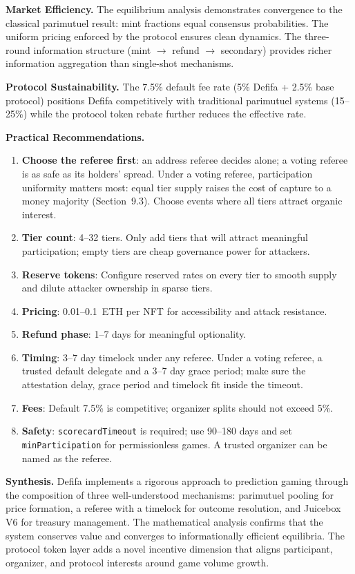 \documentclass[11pt,a4paper]{article}
\begin{document}
\textbf{Market Efficiency.} The equilibrium analysis demonstrates convergence to the classical parimutuel result: mint fractions equal consensus probabilities. The uniform pricing enforced by the protocol ensures clean dynamics. The three-round information structure (mint $\to$ refund $\to$ secondary) provides richer information aggregation than single-shot mechanisms.

\textbf{Protocol Sustainability.} The 7.5\% default fee rate (5\% Defifa + 2.5\% base protocol) positions Defifa competitively with traditional parimutuel systems (15--25\%) while the protocol token rebate further reduces the effective rate.

\textbf{Practical Recommendations.}
\begin{enumerate}[nosep]
    \item \textbf{Choose the referee first}: an address referee decides alone; a voting referee is as safe as its holders' spread. Under a voting referee, participation uniformity matters most: equal tier supply raises the cost of capture to a money majority (Section~9.3). Choose events where all tiers attract organic interest.
    \item \textbf{Tier count}: 4--32 tiers. Only add tiers that will attract meaningful participation; empty tiers are cheap governance power for attackers.
    \item \textbf{Reserve tokens}: Configure reserved rates on every tier to smooth supply and dilute attacker ownership in sparse tiers.
    \item \textbf{Pricing}: 0.01--0.1~ETH per NFT for accessibility and attack resistance.
    \item \textbf{Refund phase}: 1--7 days for meaningful optionality.
    \item \textbf{Timing}: 3--7 day timelock under any referee. Under a voting referee, a trusted default delegate and a 3--7 day grace period; make sure the attestation delay, grace period and timelock fit inside the timeout.
    \item \textbf{Fees}: Default 7.5\% is competitive; organizer splits should not exceed 5\%.
    \item \textbf{Safety}: \texttt{scorecardTimeout} is required; use 90--180 days and set \texttt{minParticipation} for permissionless games. A trusted organizer can be named as the referee.
\end{enumerate}

\textbf{Synthesis.} Defifa implements a rigorous approach to prediction gaming through the composition of three well-understood mechanisms: parimutuel pooling for price formation, a referee with a timelock for outcome resolution, and Juicebox V6 for treasury management. The mathematical analysis confirms that the system conserves value and converges to informationally efficient equilibria. The protocol token layer adds a novel incentive dimension that aligns participant, organizer, and protocol interests around game volume growth.
\end{document}
